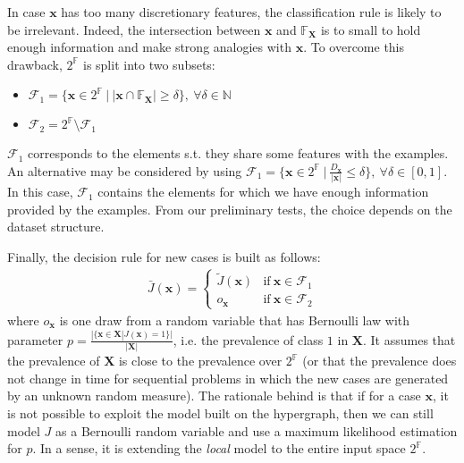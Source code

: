 
In case $\mathbf x$ has too many discretionary features, the classification rule is likely to be irrelevant. Indeed, the intersection between $\mathbf x$ and $\mathbb{F}_{\mathbf X}$ is to small to hold enough information and make strong analogies with $\mathbf x$. To overcome this drawback, $2^{\mathbb F}$ is split into two subsets:
\begin{itemize}
  \item $\mathcal{F}_1 = \{ \mathbf  x \in 2^{\mathbb F} ~ | ~ |\mathbf x \cap \mathbb{F}_{\mathbf X}| \geq \delta\}, ~ \forall \delta \in \mathbb{N}$
  \item $\mathcal{F}_2 = 2^{\mathbb F} \setminus \mathcal{F}_1$
\end{itemize}
$\mathcal{F}_1$ corresponds to the elements s.t. they share some features with the examples. An alternative may be considered by using $\mathcal{F}_1 = \{\mathbf  x \in 2^{\mathbb F} ~ | ~ \frac{D_\mathbf x}{|\mathbf x|} \leq \delta\}, ~ \forall \delta \in [0,1]$. In this case, $\mathcal{F}_1$ contains the elements for which we have enough information provided by the examples. From our preliminary tests, the choice depends on the dataset structure.

Finally, the decision rule for new cases is built as follows:
\begin{align}
\tag{R2} \label{eqn:updated_cr}
 \bar J(\mathbf x) = \left\{\begin{matrix}
 \tilde J(\mathbf x) & \text{if} ~ \mathbf x \in \mathcal{F}_1 \\
 o_{\mathbf x} & \text{if} ~ \mathbf x \in \mathcal{F}_2
\end{matrix}\right.
\end{align} where $o_{\mathbf x}$ is one draw from a random variable that has Bernoulli law with parameter $p=\frac{|\{\mathbf x \in \mathbf X | J(\mathbf x) = 1 \}|}{|\mathbf X|}$, i.e. the prevalence of class $1$ in $\mathbf X$. It assumes that the prevalence of $\mathbf X$ is close to the prevalence over $2^{\mathbb F}$ (or that the prevalence does not change in time for sequential problems in which the new cases are generated by an unknown random measure). The rationale behind is that if for a case $\mathbf x$, it is not possible to exploit the model built on the hypergraph, then we can still model $J$ as a Bernoulli random variable and use a maximum likelihood estimation for $p$. In a sense, it is extending the {\it local} model to the entire input space $2^\mathbb F$.
